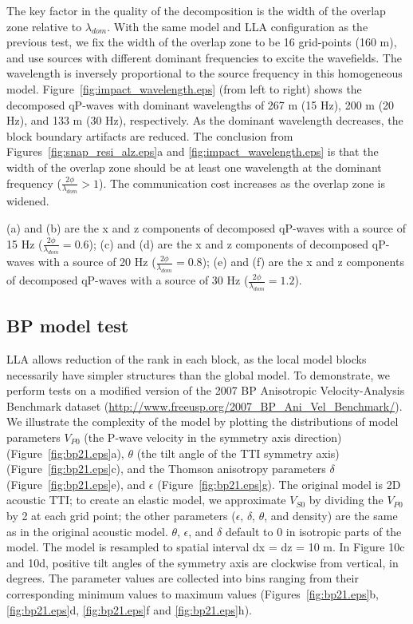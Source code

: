 \documentclass[manuscript,ulem,graphix,revised]{geophysics}
\begin{document}
The key factor in the quality of the decomposition is the width of the overlap zone relative to $\lambda_{dom}$. With the same model and LLA configuration as the previous test, we fix the width of the overlap zone to be 16 grid-points (160 m), and use sources with different dominant frequencies to excite the wavefields. 
The wavelength is inversely proportional to the source frequency in this homogeneous model. 
Figure~\ref{fig:impact_wavelength.eps} (from left to right) shows the decomposed qP-waves with dominant wavelengths of 267 m (15 Hz), 200 m (20 Hz), and 133 m (30 Hz), respectively. 
As the dominant wavelength decreases, the block boundary artifacts are reduced.
The conclusion from Figures~\ref{fig:snap_resi_alz.eps}a and \ref{fig:impact_wavelength.eps} is that the width of the overlap zone should be at least one wavelength at the dominant frequency ($\frac{2\phi}{\lambda_{dom}}>1$). The communication cost increases as the overlap zone is widened. 

 {
(a) and (b) are the x and z components of decomposed qP-waves with a source of 15 Hz ($\frac{2\phi}{\lambda_{dom}}=0.6$); 
(c) and (d) are the x and z components of decomposed qP-waves with a source of 20 Hz ($\frac{2\phi}{\lambda_{dom}}=0.8$); 
(e) and (f) are the x and z components of decomposed qP-waves with a source of 30 Hz ($\frac{2\phi}{\lambda_{dom}}=1.2$).
}

\subsection{BP model test}
\indent\indent

LLA allows reduction of the rank in each block, as the local model blocks necessarily have simpler structures than the global model. To demonstrate, we perform tests on a modified version of the 2007 BP Anisotropic Velocity-Analysis Benchmark dataset (\url{http://www.freeusp.org/2007_BP_Ani_Vel_Benchmark/}).  
We illustrate the complexity of the model by plotting the distributions of model parameters $V_{P0}$ (the P-wave velocity in the symmetry axis direction) (Figure~\ref{fig:bp21.eps}a), $\theta$ (the tilt angle of the TTI symmetry axis) (Figure~\ref{fig:bp21.eps}c), and the Thomson anisotropy parameters $\delta$ (Figure~\ref{fig:bp21.eps}e), and $\epsilon$ (Figure~\ref{fig:bp21.eps}g).  The original model is 2D acoustic TTI; to create an elastic model, we approximate $V_{S0}$ by dividing the $V_{P0}$ by 2 at each grid point; the other parameters ($\epsilon$, $\delta$, $\theta$, and density) are the same as in the original acoustic model. $\theta$, $\epsilon$, and $\delta$ default to 0 in isotropic parts of the model. The model is resampled to spatial interval dx = dz = 10 m.  In Figure 10c and 10d, positive tilt angles of the symmetry axis are clockwise from vertical, in degrees.
The parameter values are collected into bins ranging from their corresponding minimum values to maximum values (Figures~\ref{fig:bp21.eps}b, \ref{fig:bp21.eps}d, \ref{fig:bp21.eps}f and \ref{fig:bp21.eps}h). 
\end{document}
